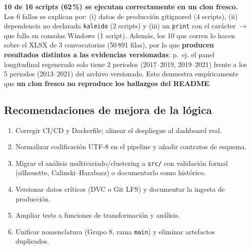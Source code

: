 \begin{tcolorbox}[hallazgo]
\textbf{10 de 16 scripts (62\,\%) se ejecutan correctamente en un clon
fresco.} Los 6 fallos se explican por: (i) datos de producción gitignored
(4 scripts), (ii) dependencia no declarada \texttt{kaleido} (2 scripts) y
(iii) un \texttt{print} con el carácter \texttt{$\rightarrow$} que falla en
consolas Windows (1 script). Además, los 10 que corren lo hacen sobre el XLSX
de 3 convocatorias (50\,891 filas), por lo que \textbf{producen resultados
distintos a las evidencias versionadas}: p.~ej. el panel longitudinal
regenerado solo tiene 2 periodos (2017--2019, 2019--2021) frente a los 5
periodos (2013--2021) del archivo versionado. Esto demuestra empíricamente
que \textbf{un clon fresco no reproduce los hallazgos del README}.
\end{tcolorbox}

\subsection{Recomendaciones de mejora de la lógica}

\begin{enumerate}
  \item Corregir CI/CD y Dockerfile; alinear el despliegue al dashboard real.
  \item Normalizar codificación UTF-8 en el pipeline y añadir contratos de esquema.
  \item Migrar el análisis multivariado/clustering a \texttt{src/} con validación
        formal (silhouette, Calinski--Harabasz) o documentarlo como histórico.
  \item Versionar datos críticos (DVC o Git LFS) y documentar la ingesta de
        producción.
  \item Ampliar tests a funciones de transformación y análisis.
  \item Unificar nomenclatura (Grupo 8, rama \texttt{main}) y eliminar artefactos
        duplicados.
\end{enumerate}

